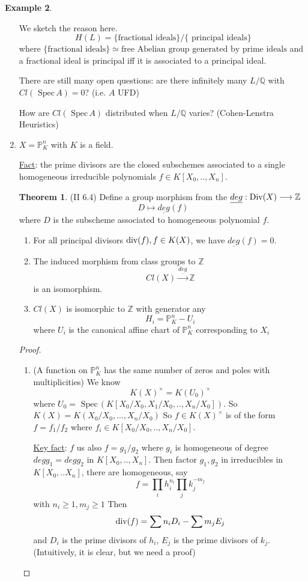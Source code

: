 \documentclass[11pt]{article}
\theoremstyle{definition}
\newtheorem{thm}{Theorem}[section]
\newtheorem{ex}[thm]{Example}
\newcommand{\spec}{\text{ Spec}\,}
\newcommand{\proj}{\mathbb P}
\newcommand{\intg}{\mathbb Z}
\newcommand{\ratl}{\mathbb Q}
\renewcommand{\div}{\textnormal{div}}
\newcommand{\Div}{\textnormal{Div}}
\newcommand{\lrta}{\longrightarrow}
\begin{document}
\begin{ex}
\begin{enumerate}[label=(\arabic*)]
We sketch the reason here.
$$
H(L)=\{\text{fractional ideals}\}/\{\text{ principal ideals}\}
$$
where $\{\text{fractional ideals}\}\simeq\text{free Abelian group generated by prime ideals}$ and  a fractional ideal is principal iff it is associated to a principal ideal.

There are still many open questions: are there infinitely many $L/\ratl$ with $Cl(\spec A)=0$? (i.e. $A$ UFD)

How are $Cl(\spec A)$ distributed when $L/\ratl$ varies? (Cohen-Lenstra Heuristics)

\item $X=\proj^n_K$ with $K$ is a field.

\underline{Fact}: the prime divisors are the closed subschemes associated to a single homogeneous irreducible polynomials $f\in  K[X_0,..,X_n]$.
\begin{thm}
(II 6.4) Define a group morphism from the $\underline{deg}: \Div(X)\lrta \intg$
$$
D\longmapsto \underline{deg}(f)
$$ 
where $D$ is the subscheme associated to homogeneous polynomial $f$.
\begin{enumerate}[label=(\alph*)]
\item For all principal divisors $\div(f), f\in K(X)$, we have $\underline{deg}(f)=0$.
\item The induced morphism from class groups to $\intg$ 
$$
Cl(X)\overset{\underline{deg}}{\lrta }\intg
$$
is  an isomorphism.
\item $Cl(X)$ is isomorphic to $\intg$ with generator any 
$$
H_i=\proj^n_K-U_i
$$
where $U_i$ is  the canonical affine chart of $\proj^n_K$ corresponding to $X_i$
\end{enumerate}
\end{thm}
\begin{proof}
\begin{enumerate}[label=(\alph*)]
\item (A function on $\proj^n_K$ has the same number of zeros and poles with multiplicities) We know
$$
K(X)^\times=K(U_0)^\times
$$
where $U_0=\spec(K[X_0/X_0,X_1/X_0,..,X_n/X_0])$. So $K(X)=K(X_0/X_0,...,X_n/X_0)$
So $f\in K(X)^\times$ is of the form $f=f_1/f_2$ where $f_i \in K[X_0/X_0,..,X_n/X_0]$. 

\underline{Key fact}: 
$f$ us also $f=g_1/g_2$ where $g_i$ is homogeneous of degree $deg g_1=deg g_2$ in $K[X_0,..,X_n]$. Then factor $g_1,g_2$ in irreducibles in $K[X_0,..X_n]$, there are homogeneous, say 
$$
f=\prod_i h_i^{n_i}\prod_j k_j^{-m_j}
$$
with $n_i\geq 1, m_j \geq 1$
Then 
$$
\div(f)=\sum n_i D_i-\sum m_j E_j
$$
and $D_i$ is the prime divisors of $h_i$, $E_j$ is the prime divisors of $k_j$. (Intuitively, it is clear, but we need a proof)


\end{enumerate}
\end{proof}
\end{enumerate}
\end{ex}
\end{document}
